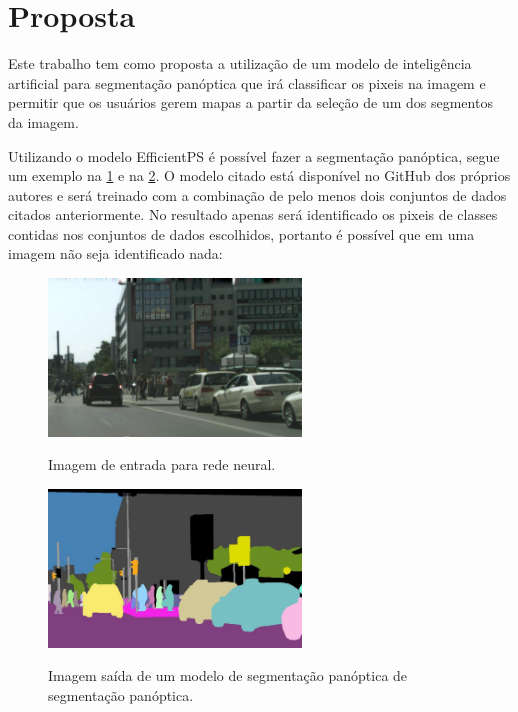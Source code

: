 \section{Proposta}

Este trabalho tem como proposta a utilização de um modelo de inteligência artificial para segmentação panóptica que irá classificar os pixeis na imagem e permitir que os usuários gerem mapas a partir da seleção de um dos segmentos da imagem.

Utilizando o modelo EfficientPS é possível fazer a segmentação panóptica, segue um exemplo na \cref{fig:segmantations_1} e na \cref{fig:segmantations_2}. O modelo citado está disponível no GitHub dos próprios autores \space{} e será treinado com a combinação de pelo menos dois conjuntos de dados citados anteriormente. No resultado apenas será identificado os pixeis de classes contidas nos conjuntos de dados escolhidos, portanto é possível que em uma imagem não seja identificado nada:

\begin{figure}[!ht]
	\centering
    \caption{Imagem de entrada para rede neural.}
	\includegraphics[width=0.6\textwidth]{figures/segmantations_1.png}
	\label{fig:segmantations_1}
\end{figure}

\begin{figure}[!ht]
	\centering
    \caption{Imagem saída de um modelo de segmentação panóptica de segmentação panóptica.}
	\includegraphics[width=0.6\textwidth]{figures/segmantations_2.png}
	\label{fig:segmantations_2}
\end{figure}

